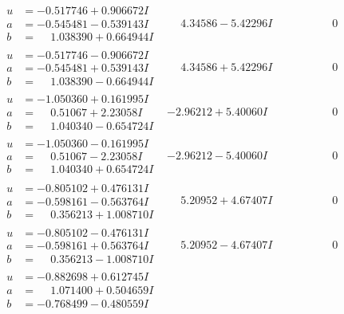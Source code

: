 \documentclass[1p]{elsarticle_modified}
\theoremstyle{definition}
\begin{document}
$$\begin{array}{c|c|c}
\begin{aligned}
u &= -0.517746 + 0.906672 I \\
a &= -0.545481 - 0.539143 I \\
b &= \phantom{-}1.038390 + 0.664944 I\end{aligned}
 & \phantom{-}4.34586 - 5.42296 I & \phantom{-0.000000 } 0 \\ \hline\begin{aligned}
u &= -0.517746 - 0.906672 I \\
a &= -0.545481 + 0.539143 I \\
b &= \phantom{-}1.038390 - 0.664944 I\end{aligned}
 & \phantom{-}4.34586 + 5.42296 I & \phantom{-0.000000 } 0 \\ \hline\begin{aligned}
u &= -1.050360 + 0.161995 I \\
a &= \phantom{-}0.51067 + 2.23058 I \\
b &= \phantom{-}1.040340 - 0.654724 I\end{aligned}
 & -2.96212 + 5.40060 I & \phantom{-0.000000 } 0 \\ \hline\begin{aligned}
u &= -1.050360 - 0.161995 I \\
a &= \phantom{-}0.51067 - 2.23058 I \\
b &= \phantom{-}1.040340 + 0.654724 I\end{aligned}
 & -2.96212 - 5.40060 I & \phantom{-0.000000 } 0 \\ \hline\begin{aligned}
u &= -0.805102 + 0.476131 I \\
a &= -0.598161 - 0.563764 I \\
b &= \phantom{-}0.356213 + 1.008710 I\end{aligned}
 & \phantom{-}5.20952 + 4.67407 I & \phantom{-0.000000 } 0 \\ \hline\begin{aligned}
u &= -0.805102 - 0.476131 I \\
a &= -0.598161 + 0.563764 I \\
b &= \phantom{-}0.356213 - 1.008710 I\end{aligned}
 & \phantom{-}5.20952 - 4.67407 I & \phantom{-0.000000 } 0 \\ \hline\begin{aligned}
u &= -0.882698 + 0.612745 I \\
a &= \phantom{-}1.071400 + 0.504659 I \\
b &= -0.768499 - 0.480559 I\end{aligned}

\end{array}$$
\end{document}
